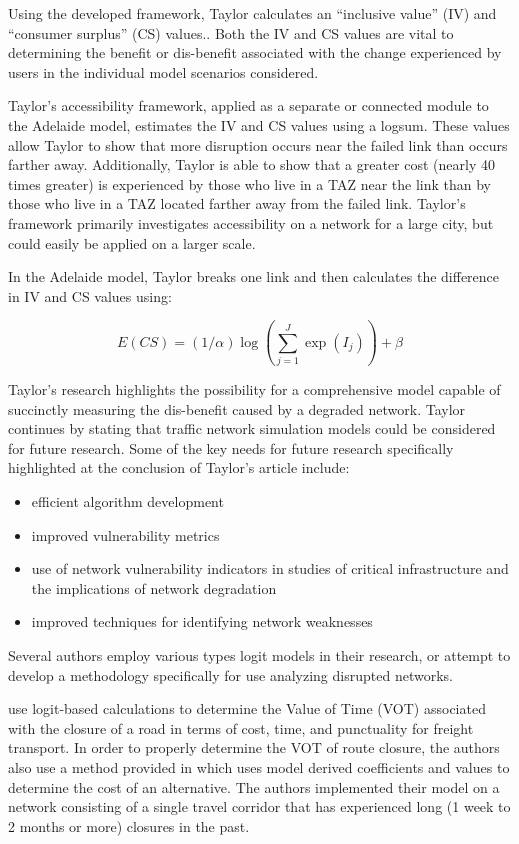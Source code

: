 Using the developed framework, Taylor calculates an ``inclusive value'' (IV)
and ``consumer surplus'' (CS) values.. Both the IV and CS values are vital to
determining the benefit or dis-benefit
associated with the change experienced by users in the individual model
scenarios considered.

Taylor's accessibility framework, applied as a separate or connected module to
the Adelaide model, estimates the IV and CS values using a logsum.
These values allow Taylor to show that more disruption occurs near the
failed link than occurs farther away. Additionally, Taylor is able to show
that a greater cost (nearly 40 times greater) is experienced by those who
live in a TAZ near the link than by those who live in a TAZ located
farther away from the failed link. Taylor's framework primarily
investigates accessibility on a network for a large city,
but could easily be applied on a larger scale.

In the Adelaide model, Taylor breaks one link and
then calculates the difference in IV and CS values using:

	\begin{equation}
		E(CS) = (1/\alpha) \log (\sum_{j = 1}^{J} \exp (I_j)) + \beta
			\label{eqn:taylor}
	\end{equation}

Taylor's research highlights the possibility for a comprehensive model capable
of succinctly measuring the dis-benefit caused by a degraded network.
Taylor continues by stating that traffic network simulation models
could be considered for future research. Some of the key needs for
future research specifically highlighted at the conclusion of Taylor's article include:

	\begin{itemize}
		\item efficient algorithm development
		\item improved vulnerability metrics
		\item use of network vulnerability indicators in studies of critical
		infrastructure and the implications of network degradation
		\item improved techniques for identifying network weaknesses
	\end{itemize}

\noindent Several authors employ various types logit models in their research,
or attempt to develop a methodology specifically for use analyzing disrupted networks.

\citet{Masiero2012} use logit-based calculations to determine the Value of
Time (VOT) associated with the closure of a road in terms of cost, time,
and punctuality for freight transport. In order to properly determine the
VOT of route closure, the authors also use a method provided in
\citet{koppelman2006} which uses model derived coefficients and values to
determine the cost of an alternative. The authors implemented their
model on a network consisting of a single travel corridor that has
experienced long (1 week to 2 months or more) closures in the past.

